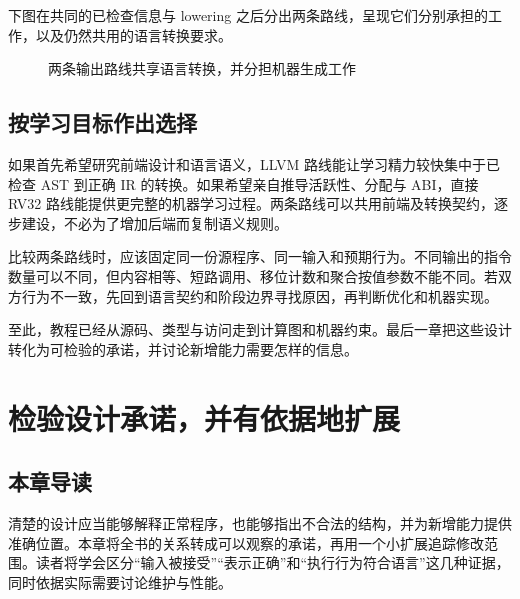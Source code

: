 下图在共同的已检查信息与 lowering 之后分出两条路线，呈现它们分别承担的工作，以及仍然共用的语言转换要求。
\begin{figure}[htbp]\centering
{}
\caption{两条输出路线共享语言转换，并分担机器生成工作}
\end{figure}

\section{按学习目标作出选择}
如果首先希望研究前端设计和语言语义，LLVM 路线能让学习精力较快集中于已检查 AST 到正确 IR 的转换。如果希望亲自推导活跃性、分配与 ABI，直接 RV32 路线能提供更完整的机器学习过程。两条路线可以共用前端及转换契约，逐步建设，不必为了增加后端而复制语义规则。

比较两条路线时，应该固定同一份源程序、同一输入和预期行为。不同输出的指令数量可以不同，但内容相等、短路调用、移位计数和聚合按值参数不能不同。若双方行为不一致，先回到语言契约和阶段边界寻找原因，再判断优化和机器实现。

至此，教程已经从源码、类型与访问走到计算图和机器约束。最后一章把这些设计转化为可检验的承诺，并讨论新增能力需要怎样的信息。

\chapter{检验设计承诺，并有依据地扩展}
\label{chap:design-evidence}
\section*{本章导读}
清楚的设计应当能够解释正常程序，也能够指出不合法的结构，并为新增能力提供准确位置。本章将全书的关系转成可以观察的承诺，再用一个小扩展追踪修改范围。读者将学会区分“输入被接受”“表示正确”和“执行行为符合语言”这几种证据，同时依据实际需要讨论维护与性能。

